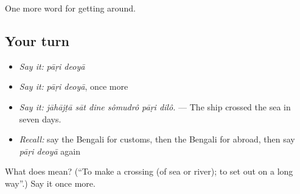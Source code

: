 \begin{grammarlens}[title={What you've built}]
One more word for getting around.
\end{grammarlens}

\subsection*{Your turn}
\begin{itemize}
\raggedright
  \item \emph{Say it:} \emph{pāṛi deoyā}
  \item \emph{Say it:} \emph{pāṛi deoyā}, once more
  \item \emph{Say it:} \emph{jāhājṭā sāt dine sômudrô pāṛi dilô.} — The ship crossed the sea in seven days.
  \item \emph{Recall:} say the Bengali for customs, then the Bengali for abroad, then say \emph{pāṛi deoyā} again
\end{itemize}

\begin{tcolorbox}[breakable,colback=teal!4,colframe=teal!35!black,title={Before you move on}]
What does   mean? (\textquotedblleft{}To make a crossing (of sea or river); to set out on a long way\textquotedblright{}.) Say it once more.
\end{tcolorbox}
